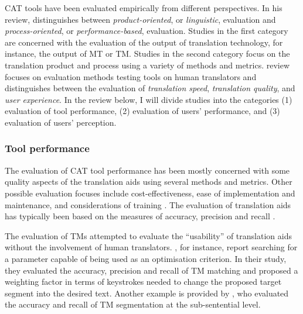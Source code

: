 CAT tools have been evaluated empirically from different perspectives. In his review, \citet{doherty2019translation} distinguishes between \textit{product-oriented}, or \textit{linguistic}, evaluation and \textit{process-oriented}, or \textit{performance-based}, evaluation. Studies in the first category are concerned with the evaluation of the output of translation technology, for instance, the output of MT or TM. Studies in the second category focus on the translation product and process using a variety of methods and metrics.  review focuses on evaluation methods testing tools on human translators and distinguishes between the evaluation of \textit{translation speed}, \textit{translation quality}, and \textit{user experience}. In the review below, I will divide studies into the categories (1) evaluation of tool performance, (2) evaluation of users’ performance, and (3) evaluation of users’ perception.


\subsubsection{Tool performance}

The evaluation of CAT tool performance has been mostly concerned with some quality aspects of the translation aids using several methods and metrics. Other possible evaluation focuses include cost-effectiveness, ease of implementation and maintenance, and considerations of training \citep{whyman1999evaluation}. The evaluation of translation aids has typically been based on the measures of accuracy, precision and recall \citep{whyman1999evaluation}.

The evaluation of TMs attempted to evaluate the ``usability'' of translation aids without the involvement of human translators. \citet{whyman1999evaluation}, for instance, report searching for a  parameter capable of being used as an optimisation criterion. In their study, they evaluated the accuracy, precision and recall of TM matching and proposed a weighting factor in terms of keystrokes needed to change the proposed target segment into the desired text. Another example is provided by \citet{colominas2008towards}, who evaluated the accuracy and recall of TM segmentation at the sub-sentential level.

